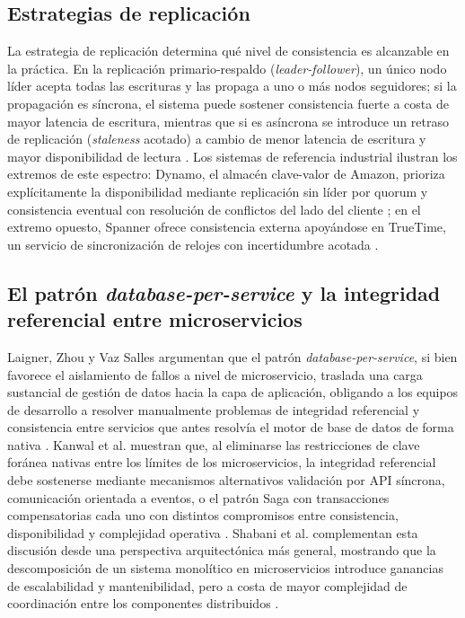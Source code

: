 \documentclass[11pt,a4paper]{article}
\begin{document}
\subsection{Estrategias de replicación}

La estrategia de replicación determina qué nivel de consistencia es alcanzable en la práctica.
En la replicación primario-respaldo (\emph{leader-follower}), un único nodo líder acepta todas
las escrituras y las propaga a uno o más nodos seguidores; si la propagación es síncrona, el
sistema puede sostener consistencia fuerte a costa de mayor latencia de escritura, mientras que si es asíncrona se introduce un retraso de replicación (\emph{staleness} acotado) a cambio de menor latencia de escritura y mayor disponibilidad de lectura \cite{bailis2013}. Los sistemas de referencia industrial ilustran los extremos de este espectro: Dynamo, el almacén
clave-valor de Amazon, prioriza explícitamente la disponibilidad mediante replicación sin líder por quorum y consistencia eventual con resolución de conflictos del lado del cliente \cite{decandia2007}; en el extremo opuesto, Spanner ofrece consistencia externa apoyándose en TrueTime, un servicio de sincronización de relojes con incertidumbre acotada \cite{corbett2013}.

\subsection{El patrón \emph{database-per-service} y la integridad referencial entre microservicios}

Laigner, Zhou y Vaz Salles argumentan que el patrón \emph{database-per-service}, si bien favorece el aislamiento de fallos a nivel de microservicio, traslada una carga sustancial de gestión de datos hacia la capa de aplicación, obligando a los equipos de desarrollo a resolver manualmente problemas de integridad referencial y consistencia entre servicios que antes resolvía el motor de base de datos de forma nativa \cite{laigner2021}. Kanwal et al. muestran
que, al eliminarse las restricciones de clave foránea nativas entre los límites de los microservicios, la integridad referencial debe sostenerse mediante mecanismos alternativos validación por API síncrona, comunicación orientada a eventos, o el patrón Saga con transacciones compensatorias cada uno con distintos compromisos entre consistencia, disponibilidad y complejidad operativa \cite{kanwal2025}. Shabani et al. complementan esta discusión desde una perspectiva arquitectónica más general, mostrando que la descomposición de
un sistema monolítico en microservicios introduce ganancias de escalabilidad y mantenibilidad, pero a costa de mayor complejidad de coordinación entre los componentes distribuidos
\cite{shabani2021}.
\end{document}
